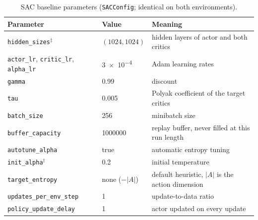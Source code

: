 \begin{table}[tbp]
  \centering
  \footnotesize
  \caption{SAC baseline parameters (\texttt{SACConfig}; identical on both environments).}
  \label{tab:app-hp-sac}
  \begin{tabular}{@{}p{4.7cm}p{3.7cm}p{5.0cm}@{}}
    \toprule
    Parameter                                                               & Value                         & Meaning                                      \\
    \midrule
    \texttt{hidden\_\allowbreak sizes}$^{\ddagger}$                                     & $(1024,1024)$                 & hidden layers of actor and both critics      \\
    \texttt{actor\_\allowbreak lr}, \texttt{critic\_\allowbreak lr}, \texttt{alpha\_\allowbreak lr}             & \num{3e-4}                    & Adam learning rates                          \\
    \texttt{gamma}                                                          & \num{0.99}                    & discount                                     \\
    \texttt{tau}                                                            & \num{0.005}                   & Polyak coefficient of the target critics     \\
    \texttt{batch\_\allowbreak size}                                                    & \num{256}                     & minibatch size                               \\
    \texttt{buffer\_\allowbreak capacity}                                               & \num{1000000}                 & replay buffer, never filled at this run length \\
    \texttt{autotune\_\allowbreak alpha}                                                & true                          & automatic entropy tuning                     \\
    \texttt{init\_\allowbreak alpha}$^{\dagger}$                                        & \num{0.2}                     & initial temperature                          \\
    \texttt{target\_\allowbreak entropy}                                                & none ($-|A|$)                 & default heuristic, $|A|$ is the action dimension \\
    \texttt{updates\_\allowbreak per\_\allowbreak env\_\allowbreak step}                                        & \num{1}                       & update-to-data ratio                         \\
    \texttt{policy\_\allowbreak update\_\allowbreak delay}                                          & \num{1}                       & actor updated on every update                \\
    \bottomrule
  \end{tabular}
\end{table}

